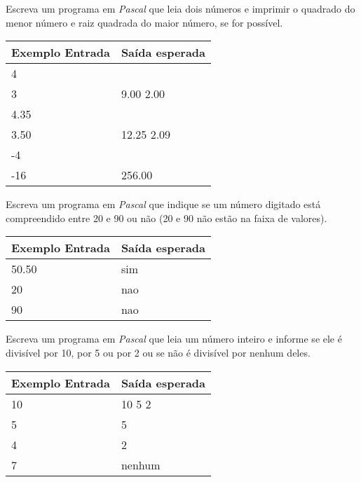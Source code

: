 \item Escreva um programa em \emph{Pascal} que leia dois números e imprimir 
o quadrado do menor número e raiz quadrada do maior número, se for possível.

\begin{center}
\begin{tabular}{|l|l|} \hline
Exemplo Entrada & Saída esperada \\ \hline
4                &                \\
3                & 9.00 2.00               \\ \hline
4.35                &                \\
3.50                & 12.25 2.09              \\ \hline
-4                &                \\ 
-16                & 256.00               \\ \hline
\end{tabular}
\end{center}

\item Escreva um programa em \emph{Pascal} que indique se um número digitado 
está compreendido entre 20 e 90 ou não (20 e 90 não estão na faixa de valores).

\begin{center}
\begin{tabular}{|l|l|} \hline
Exemplo Entrada & Saída esperada \\ \hline
50.50                & sim               \\ \hline
20                & nao               \\ \hline
90                & nao               \\ \hline
\end{tabular}
\end{center}

\item Escreva um programa em \emph{Pascal} que leia um número inteiro e 
informe se ele é divisível por 10, por 5 ou por 2 ou se não é divisível 
por nenhum deles.

\begin{center}
\begin{tabular}{|l|l|} \hline
Exemplo Entrada & Saída esperada \\ \hline
10                &  10 5 2              \\ \hline
5                &  5              \\ \hline
4                &  2              \\ \hline
7               &  nenhum              \\ \hline
\end{tabular}
\end{center}

